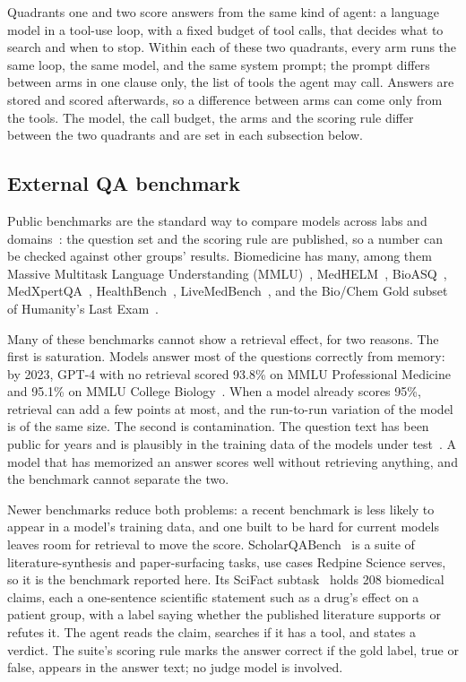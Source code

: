 \documentclass[sn-mathphys,Numbered]{sn-jnl}%
\begin{document}
Quadrants one and two score answers from the same kind of agent: a language model in
a tool-use loop, with a fixed budget of tool calls, that decides what to search and
when to stop. Within each of these two quadrants, every arm runs the same loop, the same model, and the same
system prompt; the prompt differs between arms in one clause only, the list of tools
the agent may call. Answers are stored and scored afterwards, so a difference between
arms can come only from the tools. The model, the call budget, the arms and the
scoring rule differ between the two quadrants and are set in each subsection below.

\subsection{External QA benchmark}\label{sec:method-quadrant-one}

Public benchmarks are the standard way to compare models across labs and
domains~\cite{math,swebench,ecollm}: the question set and the scoring rule are
published, so a number can be checked against other groups' results. Biomedicine has many, among them Massive Multitask Language Understanding (MMLU)~\cite{mmlu},
MedHELM~\cite{medhelm}, BioASQ~\cite{bioasq}, MedXpertQA~\cite{medxpertqa},
HealthBench~\cite{healthbench}, LiveMedBench~\cite{livemedbench}, and the Bio/Chem Gold
subset~\cite{hlegold} of Humanity's Last Exam~\cite{hle}.

Many of these benchmarks cannot show a retrieval effect, for two reasons. The first is
saturation. Models answer most of the questions correctly from memory: by 2023, GPT-4
with no retrieval scored 93.8\% on MMLU Professional Medicine and 95.1\% on
MMLU College Biology~\cite{medprompt}. When a model already scores 95\%, retrieval
can add a few points at most, and the run-to-run variation of the model is of the same
size. The second is contamination. The question text has been public for years and is
plausibly in the training data of the models under
test~\cite{sainz2023contamination,deng2024contamination}. A model that has memorized an answer scores well
without retrieving anything, and the benchmark cannot separate the two.

Newer benchmarks reduce both problems: a recent benchmark is less likely to appear in a
model's training data, and one built to be hard for current models leaves room for
retrieval to move the score. ScholarQABench~\cite{openscholar} is a suite of
literature-synthesis and paper-surfacing tasks, use cases Redpine Science serves, so it
is the benchmark reported here. Its SciFact
subtask~\cite{scifact} holds 208 biomedical claims, each a one-sentence scientific
statement such as a drug's effect on a patient group, with a label saying whether the
published literature supports or refutes it. The agent reads the claim, searches if it
has a tool, and states a verdict. The suite's scoring rule marks the answer correct if the
gold label, true or false, appears in the answer text; no judge model is involved.
\end{document}
